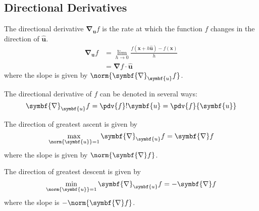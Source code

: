 \documentclass{article}
\begin{document}
\subsection{Directional Derivatives}
\begin{definition}
    The directional derivative \(\symbf{\nabla}_{\symbf{u}}f\) is the
    rate at which the function \(f\) changes in the direction of
    \(\hat{\symbf{u}}\).
    \begin{align*}
        \symbf{\nabla}_{\symbf{u}}f & = \lim_{h \to 0} \frac{f\left( \symbf{x} + h\hat{\symbf{u}} \right) - f\left( \symbf{x} \right)}{h} \\
                                    & = \symbf{\nabla}f \cdot \hat{\symbf{u}}
    \end{align*}
    where the slope is given by \(\norm{\symbf{\nabla}_{\symbf{u}}f}\).
\end{definition}
\begin{remark}
    The directional derivative of \(f\) can be denoted in several ways:
    \begin{equation*}
        \symbf{\nabla}_{\symbf{u}}f = \pdv{f}!{\symbf{u}} = \pdv{f}{\symbf{u}}
    \end{equation*}
\end{remark}
\begin{theorem}
    The direction of greatest ascent is given by
    \begin{equation*}
        \max_{\norm{\symbf{u}} = 1} \symbf{\nabla}_{\symbf{u}}f = \symbf{\nabla}f
    \end{equation*}
    where the slope is given by \(\norm{\symbf{\nabla}f}\).
\end{theorem}
\begin{theorem}
    The direction of greatest descent is given by
    \begin{equation*}
        \min_{\norm{\symbf{u}} = 1} \symbf{\nabla}_{\symbf{u}}f = -\symbf{\nabla}f
    \end{equation*}
    where the slope is \(-\norm{\symbf{\nabla}f}\).
\end{theorem}
\end{document}
